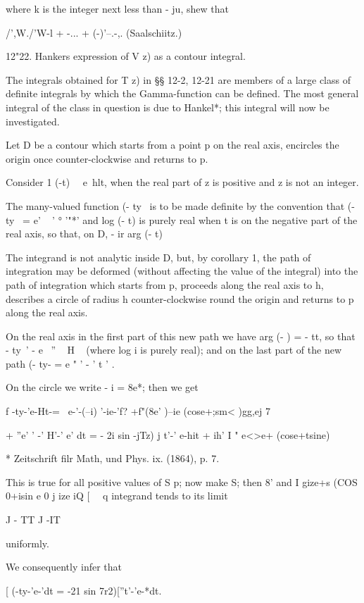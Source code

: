 where k is the integer next less than - ju, shew that

/',W./'W-l + -... + (-)'--.-,. (Saalschiitz.)

12"22. Hankers expression of V z) as a contour integral.

The integrals obtained for T z) in §§ 12-2, 12-21 are members of a
large class of definite integrals by which the Gamma-function can be
defined. The most general integral of the class in question is due to
Hankel*; this integral will now be investigated.

Let D be a contour which starts from a point p on the real axis,
encircles the origin once counter-clockwise and returns to p.

Consider 1 (-t)~~ e~hlt, when the real part of z is positive and z is
not an integer.

The many-valued function (- ty~ is to be made definite by the
convention that (- ty~ = e' ~ ' ° '"*' and log (- t) is purely real
when t is on the negative part of the real axis, so that, on D, - ir %
arg (- t) %

The integrand is not analytic inside D, but, by corollary 1, the
path of integration may be deformed (without affecting the value of
the integral) into the path of integration which starts from p,
proceeds along the real axis to h, describes a circle of radius h
counter-clockwise round the origin and returns to p along the real
axis.

On the real axis in the first part of this new path we have arg (- ) =
- tt, so that - ty~' - e~ '' ~ H ~ (where log i is purely real); and
on the last part of the new path (- ty- = e " ' - ' t ' .

On the circle we write - i = 8e*; then we get

f -ty-'e-Ht-= \ e-'-(--i) '-ie-'f? +f"(8e' )--ie (cose+;sm< )gg,ej 7

+ ''e' ' -' H'-' e' dt = - 2i sin -jTz) j t'-' e-hit + ih' I " e<>e+
(cose+tsine) \

* Zeitschrift filr Math, und Phys. ix. (1864), p. 7.

%
%

This is true for all positive values of S p; now make S; then 8' and
I gize+s (COS 0+isin e 0 j ize iQ [ \ \ q integrand tends to its limit

J - TT J -IT

uniformly.

We consequently infer that

[ (-ty-'e-'dt = -21 sin 7r2)[''t'-'e-*dt.

